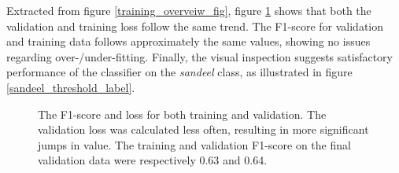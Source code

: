         
        Extracted from figure \ref{training_overveiw_fig}, figure \ref{loss_f1_duo_plot_fig} shows that both the validation and training loss follow the same trend. The F1-score for validation and training data follows approximately the same values, showing no issues regarding over-/under-fitting. Finally, the visual inspection suggests satisfactory performance of the classifier on the \textit{sandeel} class, as illustrated in figure \ref{sandeel_threshold_label}.%
        
        \clearpage
        \begin{figure}[H]
            \centering
            \qquad
            \caption[Loss and F1 score during training]{The F1-score and loss for both training and validation. The validation loss was calculated less often, resulting in more significant jumps in value. The training and validation F1-score on the final validation data were respectively 0.63 and 0.64.}%
            \label{loss_f1_duo_plot_fig}%
        \end{figure}
            
